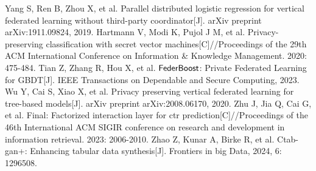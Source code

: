 \documentclass[final,1p,times]{elsarticle}
\begin{document}
\begin{thebibliography}{00}
Yang S, Ren B, Zhou X, et al. Parallel distributed logistic regression for vertical federated learning without third-party coordinator[J]. arXiv preprint arXiv:1911.09824, 2019.
Hartmann V, Modi K, Pujol J M, et al. Privacy-preserving classification with secret vector machines[C]//Proceedings of the 29th ACM International Conference on Information \& Knowledge Management. 2020: 475-484.
Tian Z, Zhang R, Hou X, et al. ${\sf FederBoost} $: Private Federated Learning for GBDT[J]. IEEE Transactions on Dependable and Secure Computing, 2023.
Wu Y, Cai S, Xiao X, et al. Privacy preserving vertical federated learning for tree-based models[J]. arXiv preprint arXiv:2008.06170, 2020.
Zhu J, Jia Q, Cai G, et al. Final: Factorized interaction layer for ctr prediction[C]//Proceedings of the 46th International ACM SIGIR conference on research and development in information retrieval. 2023: 2006-2010.
Zhao Z, Kunar A, Birke R, et al. Ctab-gan+: Enhancing tabular data synthesis[J]. Frontiers in big Data, 2024, 6: 1296508.

\end{thebibliography}
\end{document}
